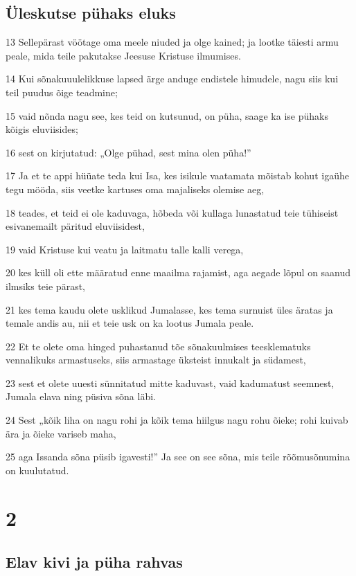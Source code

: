 \section*{Üleskutse pühaks eluks}

\par 13 Sellepärast vöötage oma meele niuded ja olge kained; ja lootke täiesti armu peale, mida teile pakutakse Jeesuse Kristuse ilmumises.
\par 14 Kui sõnakuuulelikkuse lapsed ärge anduge endistele himudele, nagu siis kui teil puudus õige teadmine;
\par 15 vaid nõnda nagu see, kes teid on kutsunud, on püha, saage ka ise pühaks kõigis eluviisides;
\par 16 sest on kirjutatud: „Olge pühad, sest mina olen püha!”
\par 17 Ja et te appi hüüate teda kui Isa, kes isikule vaatamata mõistab kohut igaühe tegu mööda, siis veetke kartuses oma majaliseks olemise aeg,
\par 18 teades, et teid ei ole kaduvaga, hõbeda või kullaga lunastatud teie tühiseist esivanemailt päritud eluviisidest,
\par 19 vaid Kristuse kui veatu ja laitmatu talle kalli verega,
\par 20 kes küll oli ette määratud enne maailma rajamist, aga aegade lõpul on saanud ilmsiks teie pärast,
\par 21 kes tema kaudu olete usklikud Jumalasse, kes tema surnuist üles äratas ja temale andis au, nii et teie usk on ka lootus Jumala peale.
\par 22 Et te olete oma hinged puhastanud tõe sõnakuulmises teesklematuks vennalikuks armastuseks, siis armastage üksteist innukalt ja südamest,
\par 23 sest et olete uuesti sünnitatud mitte kaduvast, vaid kadumatust seemnest, Jumala elava ning püsiva sõna läbi.
\par 24 Sest „kõik liha on nagu rohi ja kõik tema hiilgus nagu rohu õieke; rohi kuivab ära ja õieke variseb maha,
\par 25 aga Issanda sõna püsib igavesti!” Ja see on see sõna, mis teile rõõmusõnumina on kuulutatud.



\chapter{2}

\section*{Elav kivi ja püha rahvas}

